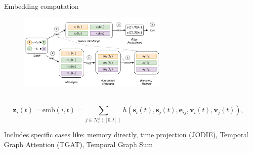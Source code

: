 \documentclass[
  8pt,
  ignorenonframetext,
  aspectratio=43,
]{beamer}
\begin{document}
\begin{frame}{Embedding computation}
\protect\hypertarget{embedding-computation}{}
\begin{figure}
\centering
\includegraphics[width=0.65\textwidth,height=\textheight]{tgn_computations.png}
\caption{~}
\end{figure}

\[
\mathbf{z}_i(t) = \mathrm{emb}(i, t) = \sum_{j \in \mathcal{N}^k_i([0, t]) } h\left(\mathbf{s}_i(t), \mathbf{s}_j(t), \mathbf{e}_{ij}, \mathbf{v}_i(t), \mathbf{v}_j(t)\right), \nonumber
\]

Includes specific cases like: memory directly, time projection (JODIE),
Temporal Graph Attention (TGAT), Temporal Graph Sum
\end{frame}
\end{document}
